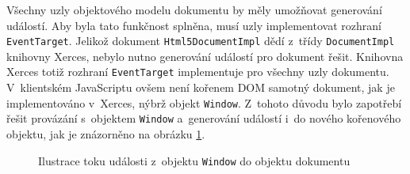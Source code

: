 Všechny uzly objektového modelu dokumentu by měly umožňovat generování událostí. Aby byla tato funkčnost splněna, musí uzly implementovat rozhraní \texttt{EventTarget}. Jelikož dokument \texttt{Html5DocumentImpl} dědí z~třídy \texttt{DocumentImpl} knihovny Xerces, nebylo nutno generování událostí pro dokument řešit. Knihovna Xerces totiž rozhraní \texttt{EventTarget} implementuje pro všechny uzly dokumentu. V~klientském JavaScriptu ovšem není kořenem DOM samotný dokument, jak je implementováno v~Xerces, nýbrž objekt \texttt{Window}. Z~tohoto důvodu bylo zapotřebí řešit provázání s~objektem \texttt{Window} a~generování událostí i~do nového kořenového objektu, jak je znázorněno na obrázku \ref{Figure.EventWindowDocument}. 

\begin{figure}[H]
  \begin{center}
    \caption{Ilustrace toku události z~objektu \texttt{Window} do objektu dokumentu}
    \label{Figure.EventWindowDocument}
  \end{center}
\end{figure}

